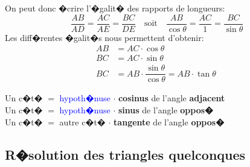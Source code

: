\documentclass[11pt,dvips]{article}
\theoremstyle{break}
\theoremstyle{nonumberbreak}
\begin{document}
On peut donc �crire l'�galit� des rapports de longueurs:
\[\dfrac{AB}{AD}=\dfrac{AC}{AE}=\dfrac{BC}{DE}\quad \text{soit}\quad\dfrac{AB}{\cos\theta}=\dfrac{AC}{1}=\dfrac{BC}{\sin\theta}\]
Les diff�rentes �galit�s nous permettent d'obtenir:
\begin{align*}
 AB&=AC\cdot  \cos\theta\\
 BC&=AC\cdot \sin\theta\\
 BC&=AB\cdot \dfrac{\sin\theta}{\cos\theta}=AB\cdot \tan\theta\
\end{align*}

\begin{Prop}
   Un c�t� $=$ \textcolor{blue}{hypoth�nuse} $\cdot$ \textbf{cosinus} de l'angle \textbf{adjacent}\\
   Un c�t� $=$ \textcolor{blue}{hypoth�nuse} $\cdot$ \textbf{sinus} de l'angle \textbf{oppos�}\\
   Un c�t� $=$ autre c�t� $\cdot$ \textbf{tangente} de l'angle \textbf{oppos�}
\end{Prop}

\subsection{R�solution des triangles quelconques}
\end{document}
